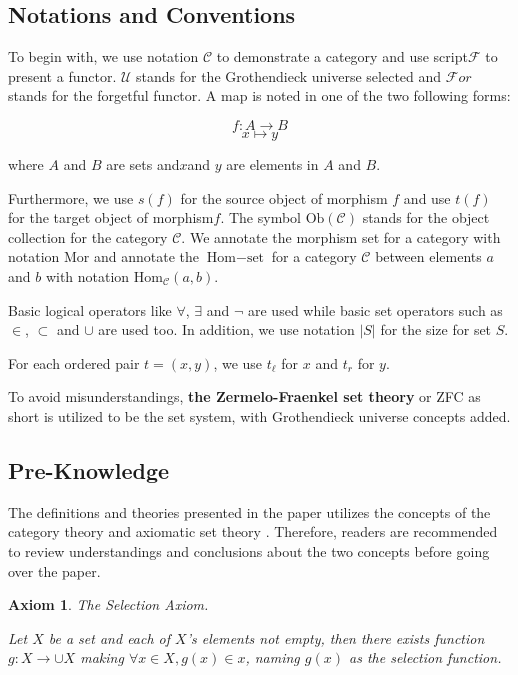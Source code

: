 \documentclass{article}
\newtheorem{axiom}{Axiom}	%
\numberwithin{theorem}{section}	%
\numberwithin{axiom}{section}	%
\numberwithin{definition}{section}	%
\begin{document}
\subsection{Notations and Conventions}

To begin with, we use notation \(\mathcal{C}\) to demonstrate a category and use script\(\mathcal{F}\) to present a functor. \(\mathcal{U}\) stands for the Grothendieck universe selected and \(\mathcal{F}\mathit{o}\mathit{r}\) stands for the forgetful functor. A map is noted in one of the two following forms:

\[f: A\to B\]
\[x\mapsto y\]

\noindent where \(A\) and \(B\) are sets and\(x\)and \(y\) are elements in \(A\) and \(B\).

 Furthermore, we use \(s(f)\) for the source object of morphism \(f\)\textit{  }and use \(t(f)\) for the target object of morphism\(f\). The symbol \(\text{Ob}(\mathcal{C})\) stands for the object collection for the category \(\mathcal{C}\). We annotate the morphism set for a category with notation \(\text{Mor}\) and annotate the \(\text{Hom}-\text{set}\) for a category \(\mathcal{C}\) between elements \(a\) and \(b\) with notation \(\text{Hom}_{\mathcal{C}}(a,b)\).

Basic logical operators like \(\forall\), \(\exists\) and \(\neg\) are used while basic set operators such as \(\in\), \(\subset\) and \(\cup\) are used too. In addition, we use notation \(|S|\) for the size for set \(S\).

For each ordered pair \(t=(x,y)\), we use \(t_{\ell }\) for \(x\) and \(t_{\mathit{r}}\) for \(y\).

To avoid misunderstandings, \textbf{the Zermelo-Fraenkel set theory} or ZFC as short is utilized to be the set system, with Grothendieck universe concepts added. \cite{1}

\subsection{Pre-Knowledge}

The definitions and theories presented in the paper utilizes the concepts of the category theory \cite{1} and axiomatic set theory \cite{1}. Therefore, readers are recommended to review understandings and conclusions about the two concepts before going over the paper.

\begin{axiom}
	The Selection Axiom.
	
	Let \(X\) be a set and each of \(X\){'}s elements not empty, then there exists function \(g:X\to \cup X\) making \(\forall x\in X,g(x)\in x\), naming \(g(x)\) as the selection function.
\end{axiom}
\end{document}
